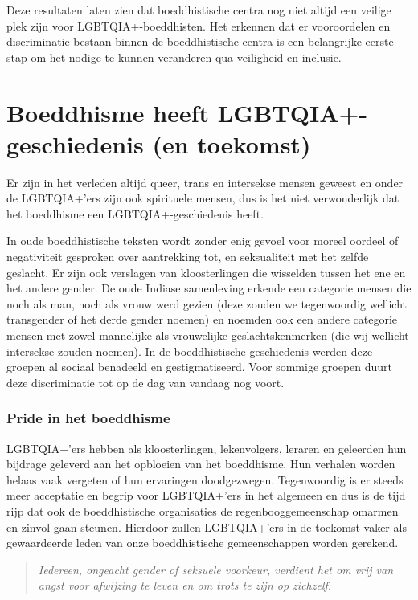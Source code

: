 \documentclass[12pt,openany]{book}
\begin{document}
Deze resultaten laten zien dat boeddhistische centra nog niet altijd een veilige plek zijn voor LGBTQIA+-boeddhisten. Het erkennen dat er vooroordelen en discriminatie bestaan binnen de boeddhistische centra is een belangrijke eerste stap om het nodige te kunnen veranderen qua veiligheid en inclusie.

\section*{Boeddhisme heeft LGBTQIA+-geschiedenis (en toekomst)}

Er zijn in het verleden altijd queer, trans en intersekse mensen geweest en onder de LGBTQIA+’ers zijn ook spirituele mensen, dus is het niet verwonderlijk dat het boeddhisme een LGBTQIA+-geschiedenis heeft.

In oude boeddhistische teksten wordt zonder enig gevoel voor moreel oordeel of negativiteit gesproken over aantrekking tot, en seksualiteit met het zelfde geslacht. Er zijn ook verslagen van kloosterlingen die wisselden tussen het ene en het andere gender. De oude Indiase samenleving erkende een categorie mensen die noch als man, noch als vrouw werd gezien (deze zouden we tegenwoordig wellicht transgender of het derde gender noemen) en noemden ook een andere categorie mensen met zowel mannelijke als vrouwelijke geslachtskenmerken (die wij wellicht intersekse zouden noemen). In de boeddhistische geschiedenis werden deze groepen al sociaal benadeeld en gestigmatiseerd. Voor sommige groepen duurt deze discriminatie tot op de dag van vandaag nog voort.

\subsubsection*{Pride in het boeddhisme}

LGBTQIA+'ers hebben als kloosterlingen, lekenvolgers, leraren en geleerden hun bijdrage geleverd aan het opbloeien van het boeddhisme. Hun verhalen worden helaas vaak vergeten of hun ervaringen doodgezwegen. Tegenwoordig is er steeds meer acceptatie en begrip voor LGBTQIA+’ers in het algemeen en dus is de tijd rijp dat ook de boeddhistische organisaties de regenbooggemeenschap omarmen en zinvol gaan steunen. Hierdoor zullen LGBTQIA+’ers in de toekomst vaker als gewaardeerde leden van onze boeddhistische gemeenschappen worden gerekend.

\begin{quote}
\textit{Iedereen, ongeacht gender of seksuele voorkeur, verdient het om vrij van angst voor afwijzing te leven en om trots te zijn op zichzelf.}
\end{quote}
\end{document}
